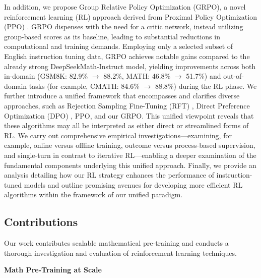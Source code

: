 In addition, we propose Group Relative Policy Optimization (GRPO), a novel reinforcement learning (RL) approach derived from Proximal Policy Optimization (PPO) \citep{schulman2017proximal}. GRPO dispenses with the need for a critic network, instead utilizing group-based scores as its baseline, leading to substantial reductions in computational and training demands. Employing only a selected subset of English instruction tuning data, GRPO achieves notable gains compared to the already strong DeepSeekMath-Instruct model, yielding improvements across both in-domain (GSM8K: 82.9\% $\rightarrow$ 88.2\%, MATH: 46.8\% $\rightarrow$ 51.7\%) and out-of-domain tasks (for example, CMATH: 84.6\% $\rightarrow$ 88.8\%) during the RL phase. We further introduce a unified framework that encompasses and clarifies diverse approaches, such as Rejection Sampling Fine-Tuning (RFT) \citep{yuan2023scaling}, Direct Preference Optimization (DPO) \citep{dpo}, PPO, and our GRPO. This unified viewpoint reveals that these algorithms may all be interpreted as either direct or streamlined forms of RL. We carry out comprehensive empirical investigations—examining, for example, online versus offline training, outcome versus process-based supervision, and single-turn in contrast to iterative RL—enabling a deeper examination of the fundamental components underlying this unified approach. Finally, we provide an analysis detailing how our RL strategy enhances the performance of instruction-tuned models and outline promising avenues for developing more efficient RL algorithms within the framework of our unified paradigm.

\subsection{Contributions}
Our work contributes scalable mathematical pre-training and conducts a thorough investigation and evaluation of reinforcement learning techniques.

\textbf{Math Pre-Training at Scale}


